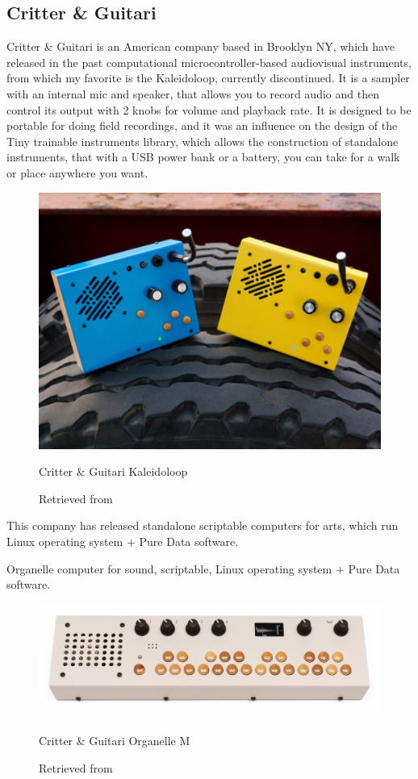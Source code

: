 \subsection{Critter \& Guitari}

Critter \& Guitari is an American company based in Brooklyn NY, which have released in the past computational microcontroller-based audiovisual instruments, from which my favorite is the Kaleidoloop, currently discontinued. It is a sampler with an internal mic and speaker, that allows you to record audio and then control its output with 2 knobs for volume and playback rate. It is designed to be portable for doing field recordings, and it was an influence on the design of the Tiny trainable instruments library, which allows the construction of standalone instruments, that with a USB power bank or a battery, you can take for a walk or place anywhere you want.

\begin{figure}[ht]
  \centering
  \includegraphics[width=0.75\linewidth,height=0.25\textheight,keepaspectratio]{images/critter-and-guitari-kaleidoloop.jpg}
  \caption{Critter \& Guitari Kaleidoloop}
  \caption*{Retrieved from \cite{website-critter-and-guitari-kaleidoloop}}
  \label{fig:critter-and-guitari-kaleidoloop}
\end{figure}

This company has released standalone scriptable computers for arts, which run Linux operating system + Pure Data software.

Organelle computer for sound, scriptable, Linux operating system + Pure Data software.

\begin{figure}[ht]
  \centering
  \includegraphics[width=0.75\linewidth,height=0.25\textheight,keepaspectratio]{images/critter-and-guitari-organelle-m.jpg}
  \caption{Critter \& Guitari Organelle M}
  \caption*{Retrieved from \cite{website-critter-and-guitari-current}}
  \label{fig:critter-and-guitari-organelle-m}
\end{figure}

